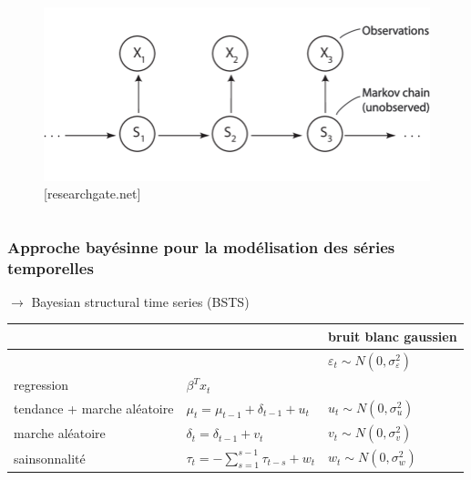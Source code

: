\documentclass{presentation_template}
\begin{document}
\begin{frame}
\begin{columns}
        \begin{column}{0.5\textwidth}
            \begin{figure}
                \includegraphics[width=\textwidth]{Figures/hmc.png}
                \caption{[researchgate.net]}
            \end{figure}
        \end{column}
    \end{columns}
\end{frame}

\begin{frame}
    \frametitle{Approche bayésinne pour la modélisation des séries temporelles}
    
    $\rightarrow$ Bayesian structural time series (BSTS) 
    \bgroup
    \def\arraystretch{1.5}
\begin{table}[]
    \begin{tabular}{lll}
        &                                                                         & bruit blanc gaussien       \\ \hline
\rowcolor[HTML]{96FFFB} 
\multicolumn{1}{l|}{\cellcolor[HTML]{96FFFB}{\color[HTML]{333333} observation}} & \multicolumn{1}{l|}{\cellcolor[HTML]{96FFFB}{\color[HTML]{333333} $y_{t}=\mu_{t}+\beta^{T} x_{t}+\tau_t +\varepsilon_{t}$}}  & {\color[HTML]{333333} $\varepsilon_{t} \sim N\left(0, \sigma_{\varepsilon}^{2}\right)$} \\ \hline
\multicolumn{1}{l|}{regression}                                                 & \multicolumn{1}{l|}{${\beta^{T} x_{t}}$}                                 &                      \\ \hline
\multicolumn{1}{l|}{tendance + marche aléatoire}                                & \multicolumn{1}{l|}{${\mu_{t}=\mu_{t-1}+\delta_{t-1}+u_{t}}$}            & $u_{t} \sim N\left(0, \sigma_{u}^{2}\right)$                        \\ \hline
\multicolumn{1}{l|}{marche aléatoire}                                           & \multicolumn{1}{l|}{$\delta_{t}=\delta_{t-1}+v_{t}$}                     & $v_{t} \sim N\left(0, \sigma_{v}^{2}\right)$                        \\ \hline
\multicolumn{1}{l|}{sainsonnalité}                                              & \multicolumn{1}{l|}{$\tau_{t}=-\sum_{s=1}^{s-1} \tau_{t-s}+w_{t}$}       & $w_{t} \sim N\left(0, \sigma_{w}^{2}\right)$                       
\end{tabular}
\end{table}
\egroup
\end{frame}
\end{document}
